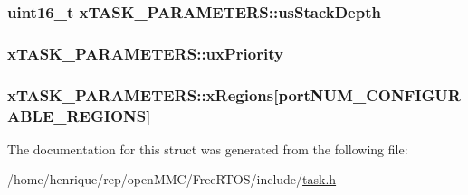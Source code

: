 \hypertarget{structxTASK__PARAMETERS_aa07bfb2214d78ba7a30592fa7b75af18}{
\subsubsection[{us\-Stack\-Depth}]{\setlength{\rightskip}{0pt plus 5cm}uint16\-\_\-t x\-T\-A\-S\-K\-\_\-\-P\-A\-R\-A\-M\-E\-T\-E\-R\-S\-::us\-Stack\-Depth}}\label{structxTASK__PARAMETERS_aa07bfb2214d78ba7a30592fa7b75af18}
\hypertarget{structxTASK__PARAMETERS_aa1aff14035db645e2bdcc85b3cdc9bab}{
\subsubsection[{ux\-Priority}]{ x\-T\-A\-S\-K\-\_\-\-P\-A\-R\-A\-M\-E\-T\-E\-R\-S\-::ux\-Priority}}\label{structxTASK__PARAMETERS_aa1aff14035db645e2bdcc85b3cdc9bab}
\hypertarget{structxTASK__PARAMETERS_ae8b97c6b7a344bf09b066b0844844d66}{
\subsubsection[{x\-Regions}]{ x\-T\-A\-S\-K\-\_\-\-P\-A\-R\-A\-M\-E\-T\-E\-R\-S\-::x\-Regions\mbox{[}{\bf port\-N\-U\-M\-\_\-\-C\-O\-N\-F\-I\-G\-U\-R\-A\-B\-L\-E\-\_\-\-R\-E\-G\-I\-O\-N\-S}\mbox{]}}}\label{structxTASK__PARAMETERS_ae8b97c6b7a344bf09b066b0844844d66}


The documentation for this struct was generated from the following file\-:\begin{DoxyCompactItemize}
\item 
/home/henrique/rep/open\-M\-M\-C/\-Free\-R\-T\-O\-S/include/\hyperlink{task_8h}{task.\-h}\end{DoxyCompactItemize}
